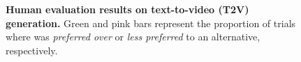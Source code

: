 \begin{figure}[tp]

\vspace{3mm}
\caption{
\textbf{Human evaluation results on text-to-video (T2V) generation.}
Green and pink bars represent the proportion of trials where \modelname{} was \textit{preferred over} or \textit{less preferred} to an alternative, respectively.
}
\label{fig:human_t2v_evals}
\end{figure}